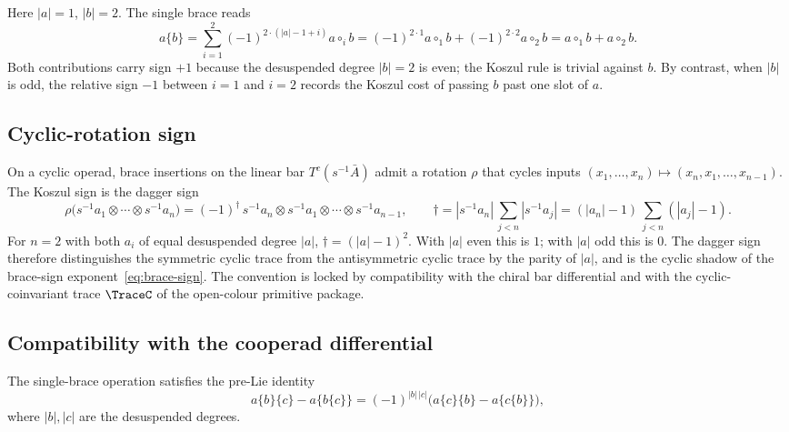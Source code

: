 \begin{example}
Here $|a| = 1$, $|b| = 2$. The single brace reads
\[
a\{b\} = \sum_{i=1}^{2} (-1)^{2 \cdot (|a| - 1 + i)} a \circ_i b
       = (-1)^{2\cdot 1} a \circ_1 b + (-1)^{2\cdot 2} a \circ_2 b
       = a \circ_1 b + a \circ_2 b.
\]
Both contributions carry sign $+1$ because the desuspended degree $|b| = 2$ is even; the Koszul rule is trivial against $b$. By contrast, when $|b|$ is odd, the relative sign $-1$ between $i = 1$ and $i = 2$ records the Koszul cost of passing $b$ past one slot of $a$.
\end{example}

\subsection{Cyclic-rotation sign}
\label{sub:brace-cyclic-sign}

On a cyclic operad, brace insertions on the linear bar $T^c(s^{-1}\bar A)$ admit a rotation $\rho$ that cycles inputs $(x_1, \ldots, x_n) \mapsto (x_n, x_1, \ldots, x_{n-1})$. The Koszul sign is the dagger sign
\begin{equation}
\label{eq:cyclic-dagger-sign}
\rho\bigl(s^{-1} a_1 \otimes \cdots \otimes s^{-1} a_n\bigr)
= (-1)^{\dagger}\,
   s^{-1} a_n \otimes s^{-1} a_1 \otimes \cdots \otimes s^{-1} a_{n-1},
\qquad
\dagger = |s^{-1} a_n|\,\sum_{j < n} |s^{-1} a_j|
       = (|a_n| - 1)\,\sum_{j < n}(|a_j| - 1).
\end{equation}
For $n = 2$ with both $a_i$ of equal desuspended degree $|a|$, $\dagger = (|a| - 1)^2$. With $|a|$ even this is $1$; with $|a|$ odd this is $0$. The dagger sign therefore distinguishes the symmetric cyclic trace from the antisymmetric cyclic trace by the parity of $|a|$, and is the cyclic shadow of the brace-sign exponent~\eqref{eq:brace-sign}. The convention is locked by compatibility with the chiral bar differential and with the cyclic-coinvariant trace $\TraceC$ of the open-colour primitive package.

\subsection{Compatibility with the cooperad differential}

\begin{proposition}
\label{prop:pre-Lie}
The single-brace operation satisfies the pre-Lie identity
\[
a\{b\}\{c\} - a\{b\{c\}\} = (-1)^{|b|\,|c|}\bigl(a\{c\}\{b\} - a\{c\{b\}\}\bigr),
\]
where $|b|, |c|$ are the desuspended degrees.
\end{proposition}

